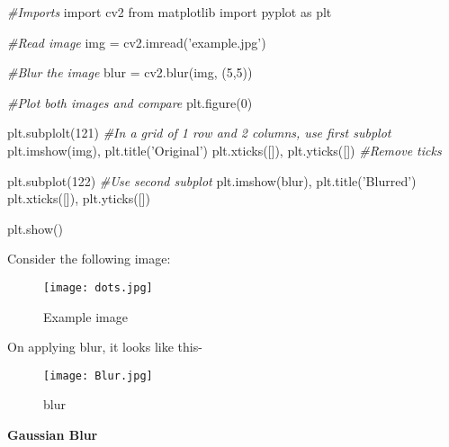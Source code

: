 \documentclass[]{article}
\newenvironment{Shaded}{}{}
\newcommand{\DecValTok}[1]{\textcolor[rgb]{0.25,0.63,0.44}{{#1}}}
\newcommand{\StringTok}[1]{\textcolor[rgb]{0.25,0.44,0.63}{{#1}}}
\newcommand{\ImportTok}[1]{{#1}}
\newcommand{\CommentTok}[1]{\textcolor[rgb]{0.38,0.63,0.69}{\textit{{#1}}}}
\newcommand{\OperatorTok}[1]{\textcolor[rgb]{0.40,0.40,0.40}{{#1}}}
\newcommand{\NormalTok}[1]{{#1}}
\begin{document}
\begin{Shaded}
\begin{Highlighting}[]
    \CommentTok{#Imports}
    \ImportTok{import} \NormalTok{cv2}
    \ImportTok{from} \NormalTok{matplotlib }\ImportTok{import} \NormalTok{pyplot }\ImportTok{as} \NormalTok{plt}
    
    \CommentTok{#Read image}
    \NormalTok{img }\OperatorTok{=} \NormalTok{cv2.imread(}\StringTok{'example.jpg'}\NormalTok{)}

    \CommentTok{#Blur the image}
    \NormalTok{blur }\OperatorTok{=} \NormalTok{cv2.blur(img, (}\DecValTok{5}\NormalTok{,}\DecValTok{5}\NormalTok{))}

    \CommentTok{#Plot both images and compare}
    \NormalTok{plt.figure(}\DecValTok{0}\NormalTok{)}
    
    \NormalTok{plt.subplolt(}\DecValTok{121}\NormalTok{) }\CommentTok{#In a grid of 1 row and 2 columns, use first subplot}
    \NormalTok{plt.imshow(img), plt.title(}\StringTok{'Original'}\NormalTok{)}
    \NormalTok{plt.xticks([]), plt.yticks([]) }\CommentTok{#Remove ticks}

    \NormalTok{plt.subplot(}\DecValTok{122}\NormalTok{) }\CommentTok{#Use second subplot}
    \NormalTok{plt.imshow(blur), plt.title(}\StringTok{'Blurred'}\NormalTok{)}
    \NormalTok{plt.xticks([]), plt.yticks([])}

    \NormalTok{plt.show()}
\end{Highlighting}
\end{Shaded}

Consider the following image:

\begin{figure}[htbp]
\centering
\texttt{[image: dots.jpg]}
\caption{Example image}
\end{figure}

On applying blur, it looks like this-

\begin{figure}
\centering
\texttt{[image: Blur.jpg]}
\caption{blur} 
\end{figure}

\newpage
\textbf{\LARGE Gaussian Blur}
\end{document}
